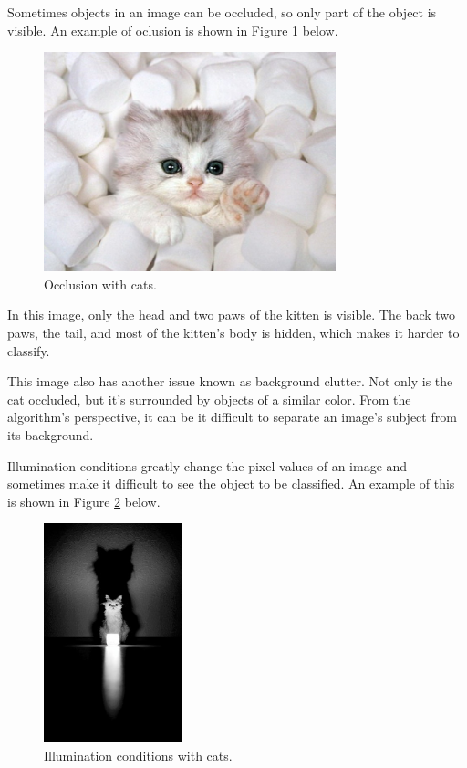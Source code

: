 \noindent Sometimes objects in an image can be occluded, so only part of the
object is visible. An example of oclusion is shown in Figure
\ref{fig:occlusion} below.

\begin{figure}[ht!] \centering
\includegraphics[height=2.5in]{../figures/kitty_occlusion.jpg}
\caption{Occlusion with cats.} \label{fig:occlusion} \end{figure}

\noindent In this image, only the head and two paws of the kitten is visible.
The back two paws, the tail, and most of the kitten's body is hidden, which
makes it harder to classify.

\noindent This image also has another issue known as background clutter. Not
only is the cat occluded, but it's surrounded by objects of a similar color.
From the algorithm's perspective, it can be it difficult to separate an image's
subject from its background.

\noindent Illumination conditions greatly change the pixel values of an image
and sometimes make it difficult to see the object to be classified. An example
of this is shown in Figure \ref{fig:illumination} below.

\begin{figure}[ht!] \centering
\includegraphics[height=2.5in]{../figures/kitty_illumination.jpg}
\caption{Illumination conditions with cats.} \label{fig:illumination}
\end{figure}

